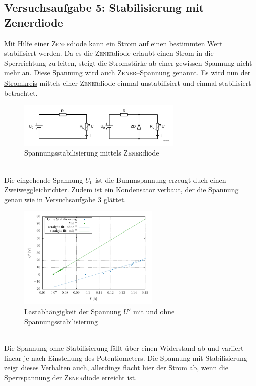 \documentclass[a4paper,10pt]{article}
\numberwithin{equation}{section}
\begin{document}
\subsection{Versuchsaufgabe 5: Stabilisierung mit Zenerdiode}
Mit Hilfe einer \textsc{Zener}diode kann ein Strom auf einen bestimmten Wert stabilisiert werden.
Da es die \textsc{Zener}diode erlaubt einen Strom in die Sperrrichtung zu leiten, steigt die Stromstärke ab einer gewissen Spannung nicht mehr an.
Diese Spannung wird auch \textsc{Zener}--Spannung genannt.
Es wird nun der \hyperref[fig:stromkreise_zener]{Stromkreis} mittels einer \textsc{Zener}diode einmal unstabilisiert und einmal stabilisiert betrachtet.
\begin{figure}[h]
        \centering
        \includegraphics[width=0.7\textwidth]{spannungsstabilisierung.png}
        \caption{Spannungsstabilisierung mittels \textsc{Zener}diode} \label{fig:stromkreise_zener}
\end{figure}\\
Die eingehende Spannung $U_0$ ist die Bummspannung erzeugt duch einen Zweiweggleichrichter.
Zudem ist ein Kondensator verbaut, der die Spannung genau wie in Versuchsaufgabe 3 glättet.
\begin{figure}[h]
        \centering
        \includegraphics[width=0.6\textwidth]{plot/5_beides_crop.pdf}
        \caption{Lastabhängigkeit der Spannung $U'$ mit und ohne Spannungsstabilisierung}
\end{figure}\\
Die Spannung ohne Stabilisierung fällt über einen Widerstand ab und variiert linear je nach Einstellung des Potentiometers.
Die Spannung mit Stabilisierung zeigt dieses Verhalten auch, allerdings flacht hier der Strom ab, wenn die Sperrspannung der \textsc{Zener}diode erreicht ist.
\end{document}
